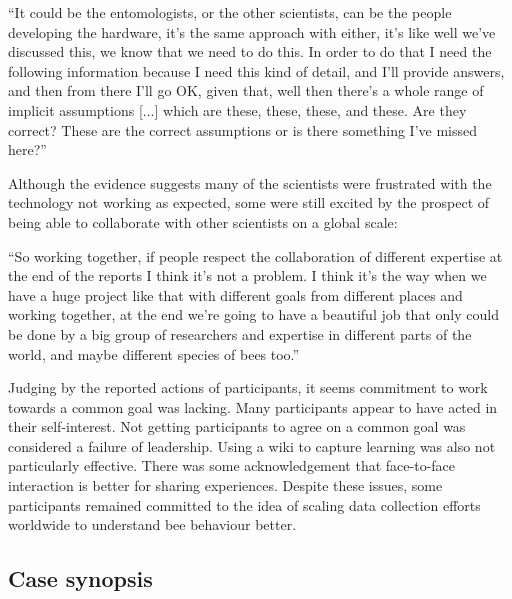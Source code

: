 \begin{displayquote}[Participant 16/3]
\small
\enquote{It could be the entomologists, or the other scientists, can be the people developing the hardware, it's the same approach with either, it's like well we've discussed this, we know that we need to do this. In order to do that I need the following information because I need this kind of detail, and I'll provide answers, and then from there I'll go OK, given that, well then there’s a whole range of implicit assumptions [...] which are these, these, these, and these. Are they correct?  These are the correct assumptions or is there something I've missed here?} 
\end{displayquote}

Although the evidence suggests many of the scientists were frustrated with the technology not working as expected, some were still excited by the prospect of being able to collaborate with other scientists on a global scale: 

\begin{displayquote}[Participant 9/3]
\small
\enquote{So working together, if people respect the collaboration of different expertise at the end of the reports I think it's not a problem.  I think it's the way when we have a huge project like that with different goals from different places and working together, at the end we're going to have a beautiful job that only could be done by a big group of researchers and expertise in different parts of the world, and maybe different species of bees too.} 
\end{displayquote}

Judging by the reported actions of participants, it seems commitment to work towards a common goal was lacking. Many participants appear to have acted in their self-interest. Not getting participants to agree on a common goal was considered a failure of leadership. Using a wiki to capture learning was also not particularly effective. There was some acknowledgement that face-to-face interaction is better for sharing experiences. Despite these issues, some participants remained committed to the idea of scaling data collection efforts worldwide to understand bee behaviour better.

\subsection{Case synopsis}

